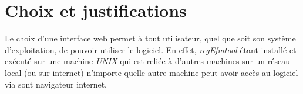 \chapter{Choix et justifications}

Le choix d'une interface web permet à tout utilisateur, quel que soit son système d'exploitation, de pouvoir utiliser le logiciel. En effet, \emph{regEfmtool} étant installé et exécuté sur une machine \emph{UNIX} qui est reliée à d'autres machines sur un réseau local (ou sur internet) n'importe quelle autre machine peut avoir accès au logiciel via sont navigateur internet.
